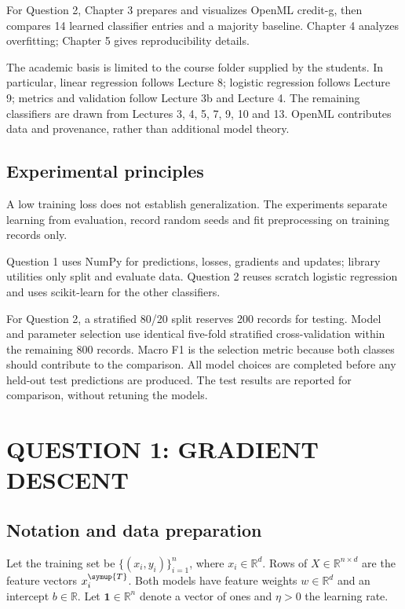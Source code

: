 For Question 2, Chapter 3 prepares and visualizes OpenML credit-g, then compares 14 learned classifier entries and a majority baseline. Chapter 4 analyzes overfitting; Chapter 5 gives reproducibility details.

The academic basis is limited to the course folder supplied by the students. In particular, linear regression follows Lecture 8; logistic regression follows Lecture 9; metrics and validation follow Lecture 3b and Lecture 4. The remaining classifiers are drawn from Lectures 3, 4, 5, 7, 9, 10 and 13. OpenML contributes data and provenance, rather than additional model theory.

\section{Experimental principles}
A low training loss does not establish generalization. The experiments separate learning from evaluation, record random seeds and fit preprocessing on training records only.

Question 1 uses NumPy for predictions, losses, gradients and updates; library utilities only split and evaluate data. Question 2 reuses scratch logistic regression and uses scikit-learn for the other classifiers.

For Question 2, a stratified 80/20 split reserves 200 records for testing. Model and parameter selection use identical five-fold stratified cross-validation within the remaining 800 records. Macro F1 is the selection metric because both classes should contribute to the comparison. All model choices are completed before any held-out test predictions are produced. The test results are reported for comparison, without retuning the models.


\clearpage
\chapter{QUESTION 1: GRADIENT DESCENT}
\section{Notation and data preparation}
Let the training set be $\{(x_i,y_i)\}_{i=1}^{n}$, where $x_i\in\mathbb R^d$. Rows of $X\in\mathbb R^{n\times d}$ are the feature vectors $x_i^{\symup{T}}$. Both models have feature weights $w\in\mathbb R^d$ and an intercept $b\in\mathbb R$. Let $\mathbf1\in\mathbb R^n$ denote a vector of ones and $\eta>0$ the learning rate.

